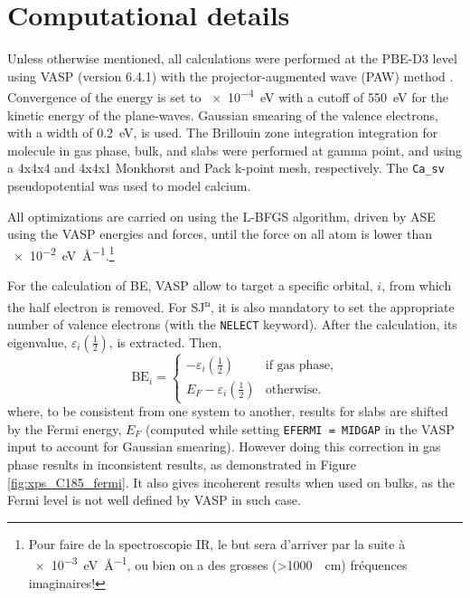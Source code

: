 \documentclass[12pt,a4paper]{article}
\begin{document}
\section{Computational details}

Unless otherwise mentioned, all calculations were performed at the PBE-D3 level using VASP (version 6.4.1) with the projector-augmented wave (PAW) method \cite{blochlProjectorAugmentedwaveMethod1994}.  Convergence of the energy is set to \SI{e-4}{\electronvolt} with a cutoff of \SI{550}{\electronvolt} for the kinetic energy of the plane-waves. Gaussian smearing of the valence electrons, with a width of \SI{0.2}{\electronvolt}, is used. The Brillouin zone integration integration for molecule in gas phase, bulk, and slabs were performed at gamma point, and using a 4x4x4 and 4x4x1 Monkhorst and Pack k-point mesh, respectively. The \texttt{Ca\_sv} pseudopotential was used to model calcium.

All optimizations are carried on using the L-BFGS algorithm, driven by ASE \cite{larsenAtomicSimulationEnvironment2017} using the VASP energies and forces, until the force on all atom is lower than \SI{e-2}{\electronvolt\per\angstrom}.\footnote{Pour faire de la spectroscopie IR, le but sera d'arriver par la suite à \SI{e-3}{\electronvolt\per\angstrom}, ou bien on a des grosses (>\SI{1000}{\per\centi\meter}) fréquences imaginaires!}

For the calculation of BE, VASP allow to target a specific orbital, $i$, from which the half electron is removed. For SJ\textsuperscript{n}, it is also mandatory to set the appropriate number of valence electrons (with the \texttt{NELECT} keyword). After the calculation, its eigenvalue, $\varepsilon_i\left(\frac{1}{2}\right)$, is extracted. Then,
\begin{equation}
	\text{BE}_i = 	\begin{cases}
		-\varepsilon_i\left(\tfrac{1}{2}\right) & \text{if  gas phase}, \\
	E_F-\varepsilon_i\left(\tfrac{1}{2}\right) & \text{otherwise}. \label{eq:xpsbe}
	\end{cases}
\end{equation}
where,  to be consistent from one system to another, results for slabs are shifted by the Fermi energy, $E_F$ (computed while setting \texttt{EFERMI = MIDGAP} in the VASP input to account for Gaussian smearing). However doing this correction in gas phase results in inconsistent results, as demonstrated in Figure \ref{fig:xps_C185_fermi}. It also gives incoherent results when used on bulks, as the Fermi level is not well defined by VASP in such case.
\end{document}
